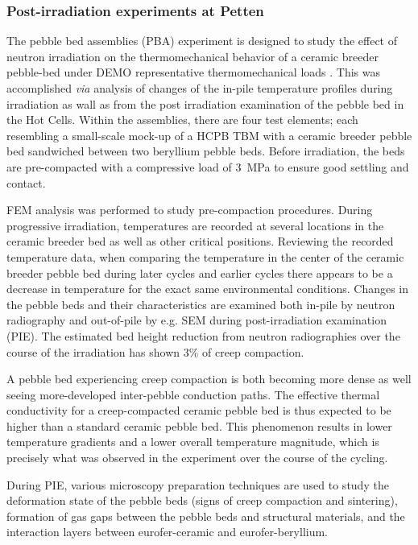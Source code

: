 \subsubsection{Post-irradiation experiments at Petten}
The pebble bed assemblies (PBA) experiment is designed to study the effect of neutron irradiation on the thermomechanical behavior of a ceramic breeder pebble-bed under DEMO representative thermomechanical loads \cite{Magielsen2007}. This was accomplished \textit{via} analysis of changes of the in-pile temperature profiles during irradiation as wall as from the post irradiation examination of the pebble bed in the Hot Cells. Within the assemblies, there are four test elements; each resembling a small-scale mock-up of a HCPB TBM with a ceramic breeder pebble bed sandwiched between two beryllium pebble beds. Before irradiation, the beds are pre-compacted with a compressive load of \SI{3}{\mega\pascal} to ensure good settling and contact.

FEM analysis was performed to study pre-compaction procedures.  During progressive irradiation, temperatures are recorded at several locations in the ceramic breeder bed as well as other critical positions. Reviewing the recorded temperature data, when comparing the temperature in the center of the ceramic breeder pebble bed during later cycles and earlier cycles there appears to be a decrease in temperature for the exact same environmental conditions. Changes in the pebble beds and their characteristics are examined both in-pile by neutron radiography and out-of-pile by e.g. SEM during post-irradiation examination (PIE). The estimated bed height reduction from neutron radiographies over the course of the irradiation has shown 3\% of creep compaction. 

A pebble bed experiencing creep compaction is both becoming more dense as well seeing more-developed inter-pebble conduction paths. The effective thermal conductivity for a creep-compacted ceramic pebble bed is thus expected to be higher than a standard ceramic pebble bed. This phenomenon results in lower temperature gradients and a lower overall temperature magnitude, which is precisely what was observed in the experiment over the course of the cycling. 

During PIE, various microscopy preparation techniques are used to study the deformation state of the pebble beds (signs of creep compaction and sintering), formation of gas gaps between the pebble beds and structural materials, and the interaction layers between eurofer-ceramic and eurofer-beryllium. 

